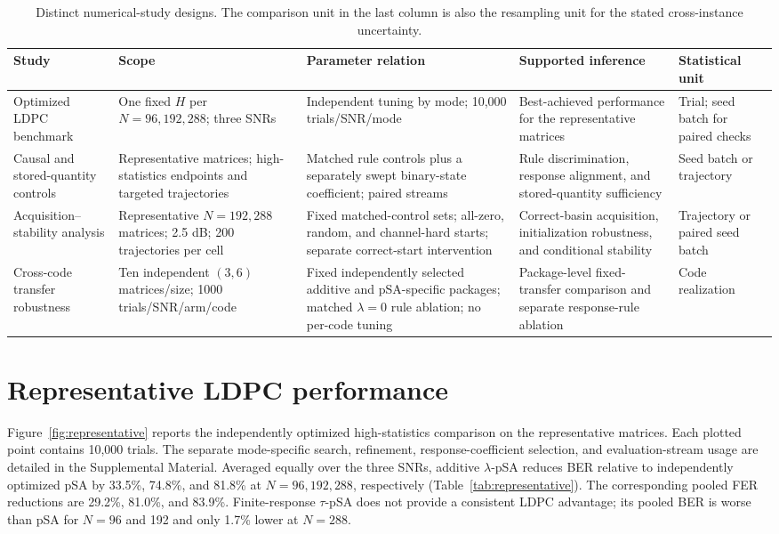 \documentclass[aps,prapplied,reprint,superscriptaddress,longbibliography,floatfix]{revtex4-2}
\newcommand{\psa}{pSA}
\newcommand{\lpsa}{$\lambda$-pSA}
\newcommand{\tpsa}{$\tau$-pSA}
\begin{document}
\begin{table}[t]
\caption{Distinct numerical-study designs.  The comparison unit in the last column is also the resampling unit for the stated cross-instance uncertainty.}
\label{tab:protocols}
\scriptsize
\begin{tabular}{@{}p{}p{}p{}p{}p{}@{}}
\toprule
\raggedright Study & \raggedright Scope & \raggedright Parameter relation & \raggedright Supported inference & \raggedright Statistical unit \tabularnewline
\midrule
\raggedright Optimized LDPC benchmark & \raggedright One fixed $H$ per $N=96,192,288$; three SNRs & \raggedright Independent tuning by mode; 10,000 trials/SNR/mode & \raggedright Best-achieved performance for the representative matrices & \raggedright Trial; seed batch for paired checks \tabularnewline
\raggedright Causal and stored-quantity controls & \raggedright Representative matrices; high-statistics endpoints and targeted trajectories & \raggedright Matched rule controls plus a separately swept binary-state coefficient; paired streams & \raggedright Rule discrimination, response alignment, and stored-quantity sufficiency & \raggedright Seed batch or trajectory \tabularnewline
\raggedright Acquisition--stability analysis & \raggedright Representative $N=192,288$ matrices; 2.5 dB; 200 trajectories per cell & \raggedright Fixed matched-control sets; all-zero, random, and channel-hard starts; separate correct-start intervention & \raggedright Correct-basin acquisition, initialization robustness, and conditional stability & \raggedright Trajectory or paired seed batch \tabularnewline
\raggedright Cross-code transfer robustness & \raggedright Ten independent $(3,6)$ matrices/size; 1000 trials/SNR/arm/code & \raggedright Fixed independently selected additive and pSA-specific packages; matched $\lambda=0$ rule ablation; no per-code tuning & \raggedright Package-level fixed-transfer comparison and separate response-rule ablation & \raggedright Code realization \tabularnewline
\bottomrule
\end{tabular}
\end{table}

\section{Representative LDPC performance}
\label{sec:performance}

Figure~\ref{fig:representative} reports the independently optimized high-statistics comparison on the representative matrices.  Each plotted point contains 10,000 trials.  The separate mode-specific search, refinement, response-coefficient selection, and evaluation-stream usage are detailed in the Supplemental Material.  Averaged equally over the three SNRs, additive \lpsa{} reduces BER relative to independently optimized \psa{} by 33.5\%, 74.8\%, and 81.8\% at $N=96,192,288$, respectively (Table~\ref{tab:representative}).  The corresponding pooled FER reductions are 29.2\%, 81.0\%, and 83.9\%.  Finite-response \tpsa{} does not provide a consistent LDPC advantage; its pooled BER is worse than \psa{} for $N=96$ and 192 and only 1.7\% lower at $N=288$.
\end{document}
